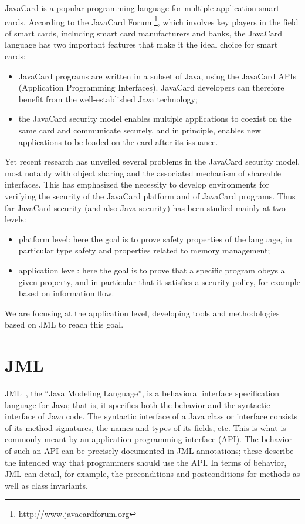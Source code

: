 JavaCard is a popular programming language for multiple
application smart cards.  According to the JavaCard Forum \footnote{http://www.javacardforum.org},
which involves key players in the field of smart cards, 
including smart card manufacturers and banks, the JavaCard language has two
important features that make it the ideal choice for smart cards: 
\begin{itemize}
\item JavaCard programs are written in a subset of Java, using
the JavaCard APIs (Application Programming Interfaces). JavaCard
developers can therefore benefit from the well-established Java technology; 

\item the JavaCard security model enables multiple applications to
coexist  on the same card and communicate securely, and in principle,
enables new applications to be loaded on the card after its issuance.
\end{itemize}
Yet recent research has unveiled several problems in the JavaCard
security model, most notably with object sharing and the associated
mechanism of shareable interfaces.
This has  emphasized the necessity to develop environments for
verifying the security of the JavaCard platform and of JavaCard
programs.  Thus far JavaCard security (and also Java security) has
been studied  mainly at two levels:    
\begin{itemize}
\item  platform level: here the goal is to prove safety properties of
the language, in particular type safety and properties related to
memory management; 
\item  application level: here the goal is to prove that a specific
program obeys a given property, and in particular that it satisfies a
security policy, for example based on information flow. 
\end{itemize}
We are focusing at the application level, developing tools and methodologies based on JML to reach this goal.
\section{JML}
JML~\cite{Leavens-Baker-Ruby99b,Leavens-Baker-Ruby03}, the
``Java Modeling Language'', is a behavioral interface
specification language for Java; that is, it specifies both the behavior
and the syntactic interface of Java code.  The syntactic interface of
a Java class or interface consists of its method signatures,
the names and types of its fields, etc.
This is what is commonly meant by an application programming
interface (API).
The behavior of such an API can be precisely documented in JML annotations;
these describe the intended way that programmers should
use the API.  In terms of behavior, JML can detail, for example, the
preconditions and postconditions for methods as well as class
invariants.

